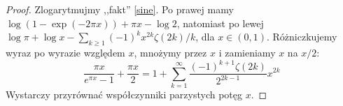 \begin{proof}
	Zlogarytmujmy ,,fakt'' \ref{sine}.
	Po prawej mamy $\log(1 - \exp(-2 \pi x)) + \pi x - \log 2$, natomiast po lewej $\log \pi + \log x - \sum_{k \ge 1} (-1)^{k} x^{2k} \zeta(2k) / k$, dla $x \in (0,1)$.
	Różniczkujemy wyraz po wyrazie względem $x$, mnożymy przez $x$ i zamieniamy $x$ na $x/2$:
	\[\frac{\pi x}{e^{\pi x}- 1} + \frac{\pi x}{2} =  1 + \sum_{k=1}^\infty \frac{(-1)^{k+1} \zeta(2k)}{2^{2k-1}} x^{2k}\]
	Wystarczy przyrównać współczynniki parzystych potęg $x$.
\end{proof}